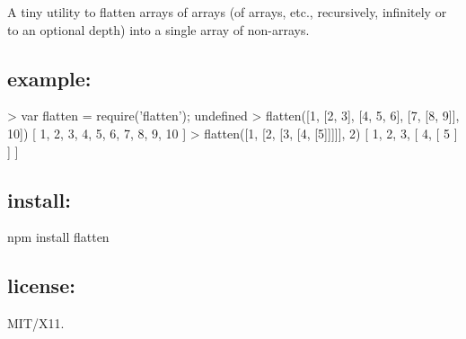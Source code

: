 A tiny utility to flatten arrays of arrays (of arrays, etc., recursively, infinitely or to an optional depth) into a single array of non-\/arrays.

\subsection*{example\+:}


\begin{DoxyCode}
> var flatten = require('flatten');
undefined
> flatten([1, [2, 3], [4, 5, 6], [7, [8, 9]], 10])
[ 1,
  2,
  3,
  4,
  5,
  6,
  7,
  8,
  9,
  10 ]
> flatten([1, [2, [3, [4, [5]]]]], 2)
[ 1,
  2,
  3,
  [ 4, [ 5 ] ] ]
\end{DoxyCode}


\subsection*{install\+:}

\begin{DoxyVerb}npm install flatten
\end{DoxyVerb}


\subsection*{license\+:}

M\+I\+T/\+X11. 